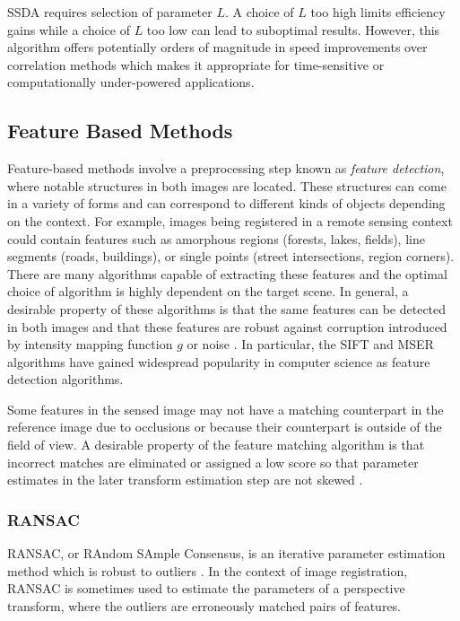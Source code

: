 \documentclass[tocnosub,noragright,centerchapter,12pt]{uiucecethesis09}
\begin{document}
SSDA requires selection of parameter $L$.  A choice of $L$ too high limits efficiency gains while a choice of $L$ too low can lead to suboptimal results.  However, this algorithm offers potentially orders of magnitude in speed improvements over correlation methods which makes it appropriate for time-sensitive or computationally under-powered applications.

\subsection{Feature Based Methods}

Feature-based methods involve a preprocessing step known as \emph{feature detection}, where notable structures in both images are located.  These structures can come in a variety of forms and can correspond to different kinds of objects depending on the context.  For example, images being registered in a remote sensing context could contain features such as amorphous regions (forests, lakes, fields), line segments (roads, buildings), or single points (street intersections, region corners).  There are many algorithms capable of extracting these features and the optimal choice of algorithm is highly dependent on the target scene.  In general, a desirable property of these algorithms is that the same features can be detected in both images and that these features are robust against corruption introduced by intensity mapping function $g$ or noise \cite{zitova}.  In particular, the SIFT \cite{sift} and MSER \cite{mers} algorithms have gained widespread popularity in computer science as feature detection algorithms.

Some features in the sensed image may not have a matching counterpart in the reference image due to occlusions or because their counterpart is outside of the field of view. A desirable property of the feature matching algorithm is that incorrect matches are eliminated or assigned a low score so that parameter estimates in the later transform estimation step are not skewed \cite{zitova}.

\subsubsection{RANSAC}


RANSAC, or RAndom SAmple Consensus, is an iterative parameter estimation method which is robust to outliers \cite{french}.  In the context of image registration, RANSAC is sometimes used to estimate the parameters of a perspective transform, where the outliers are erroneously matched pairs of features.
\end{document}
